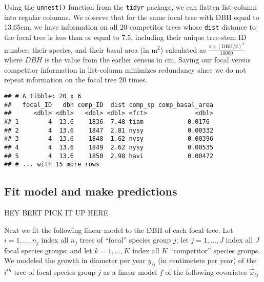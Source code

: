 \documentclass[12pt]{article}
\newenvironment{Shaded}{\begin{snugshade}}{\end{snugshade}}
\newcommand{\DataTypeTok}[1]{\textcolor[rgb]{0.13,0.29,0.53}{#1}}
\newcommand{\DecValTok}[1]{\textcolor[rgb]{0.00,0.00,0.81}{#1}}
\newcommand{\KeywordTok}[1]{\textcolor[rgb]{0.13,0.29,0.53}{\textbf{#1}}}
\newcommand{\NormalTok}[1]{#1}
\newcommand{\OperatorTok}[1]{\textcolor[rgb]{0.81,0.36,0.00}{\textbf{#1}}}
\newcommand{\StringTok}[1]{\textcolor[rgb]{0.31,0.60,0.02}{#1}}
\begin{document}
Using the \texttt{unnest()} function from the \texttt{tidyr} package, we
can flatten list-column into regular columns. We observe that for the
same focal tree with DBH equal to 13.65cm, we have information on all 20
competitor trees whose \texttt{dist} distance to the focal tree is less
than or equal to 7.5, including their unique tree-stem ID number, their
species, and their basal area (in m\(^2\)) calculated as
\(\frac{\pi \times (\text{DBH/2})^2}{10000}\) where \(DBH\) is the value
from the earlier census in cm. Saving our focal versus competitor
information in list-column minimizes redundancy since we do not repeat
information on the focal tree 20 times.

\begin{Shaded}
\end{Shaded}

\begin{verbatim}
## # A tibble: 20 x 6
##   focal_ID   dbh comp_ID  dist comp_sp comp_basal_area
##      <dbl> <dbl>   <dbl> <dbl> <fct>             <dbl>
## 1        4  13.6    1836  7.48 tiam            0.0176 
## 2        4  13.6    1847  2.81 nysy            0.00332
## 3        4  13.6    1848  1.62 nysy            0.00396
## 4        4  13.6    1849  2.62 nysy            0.00535
## 5        4  13.6    1850  2.98 havi            0.00472
## # ... with 15 more rows
\end{verbatim}

\hypertarget{model-fit-predict}{%
\subsection{Fit model and make predictions}\label{model-fit-predict}}

HEY BERT PICK IT UP HERE

Next we fit the following linear model to the DBH of each focal tree.
Let \(i = 1, \ldots, n_j\) index all \(n_j\) trees of ``focal'' species
group \(j\); let \(j = 1, \ldots, J\) index all \(J\) focal species
groups; and let \(k = 1, \ldots, K\) index all \(K\) ``competitor''
species groups. We modeled the growth in diameter per year \(y_{ij}\)
(in centimeters per year) of the \(i^{th}\) tree of focal species group
\(j\) as a linear model \(f\) of the following covariates
\(\vec{x}_{ij}\)
\end{document}
